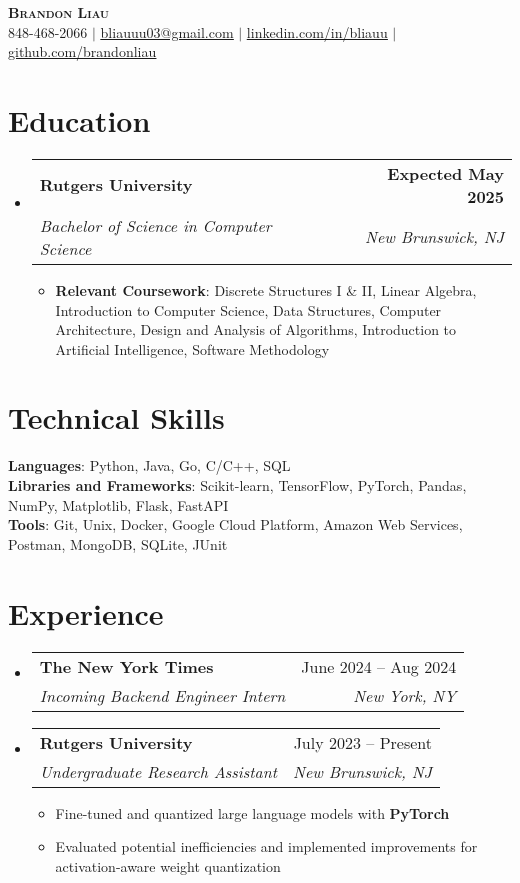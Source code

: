 \documentclass[letterpaper,11pt]{article}
\makeatletter
\newcommand{\resumeItem}[1]{
  \item\small{
    {#1 \vspace{-2pt}}
  }
}
\newcommand{\resumeSubheading}[4]{
  \vspace{-2pt}\item
    \begin{tabular*}{0.97\textwidth}[t]{l@{\extracolsep{\fill}}r}
      \textbf{#1} & #2 \\
      \textit{\small#3} & \textit{\small #4} \\
    \end{tabular*}\vspace{-7pt}
}
\newcommand{\resumeSubHeadingListStart}{\begin{itemize}[leftmargin=0.15in, label={}]}
\newcommand{\resumeSubHeadingListEnd}{\end{itemize}}
\newcommand{\resumeItemListStart}{\begin{itemize}}
\newcommand{\resumeItemListEnd}{\end{itemize}\vspace{-3pt}}
\makeatother
\begin{document}
\begin{center}
    \textbf{\Huge \scshape Brandon Liau} \\ \vspace{8pt}
    \small {} 848-468-2066 $|$ 
    \href{mailto:x@x.com}{ \underline{bliauuu03@gmail.com}} $|$ 
    \href{https://linkedin.com/in/bliauu}{ \underline{linkedin.com/in/bliauu}} $|$
    \href{https://github.com/brandonliau}{ \underline{github.com/brandonliau}}
\end{center}


\section{Education}
  \resumeSubHeadingListStart
    \resumeSubheading
      {Rutgers University}{\textbf{Expected May 2025}}
      {Bachelor of Science in Computer Science}{New Brunswick, NJ}
      \resumeItemListStart
        \resumeItem{\textbf{Relevant Coursework}: Discrete Structures I \& II, Linear Algebra, Introduction to Computer Science, Data Structures, Computer Architecture, Design and Analysis of Algorithms, Introduction to Artificial Intelligence, Software Methodology}
      \resumeItemListEnd
  \resumeSubHeadingListEnd


\section{Technical Skills}
 \begin{itemize}[leftmargin=0.15in, label={}]
    \small{\item{
     \textbf{Languages}{: Python, Java, Go, C/C++, SQL} \vspace{1.5pt}\\
     \textbf{Libraries and Frameworks}{: Scikit-learn, TensorFlow, PyTorch, Pandas, NumPy, Matplotlib, Flask, FastAPI} \vspace{1.5pt}\\
     \textbf{Tools}{: Git, Unix, Docker, Google Cloud Platform, Amazon Web Services, Postman, MongoDB, SQLite, JUnit} \\
    }}
 \end{itemize}


\section{Experience}
  \resumeSubHeadingListStart
    \resumeSubheading
      {The New York Times}{June 2024 -- Aug 2024}
      {Incoming Backend Engineer Intern}{New York, NY}
    \resumeSubheading
      {Rutgers University}{July 2023 -- Present}
      {Undergraduate Research Assistant}{New Brunswick, NJ}
      \resumeItemListStart
        \resumeItem{Fine-tuned and quantized large language models with \textbf{PyTorch}}
        \resumeItem{Evaluated potential inefficiencies and implemented improvements for activation-aware weight quantization}
      \resumeItemListEnd
  \resumeSubHeadingListEnd
\end{document}
